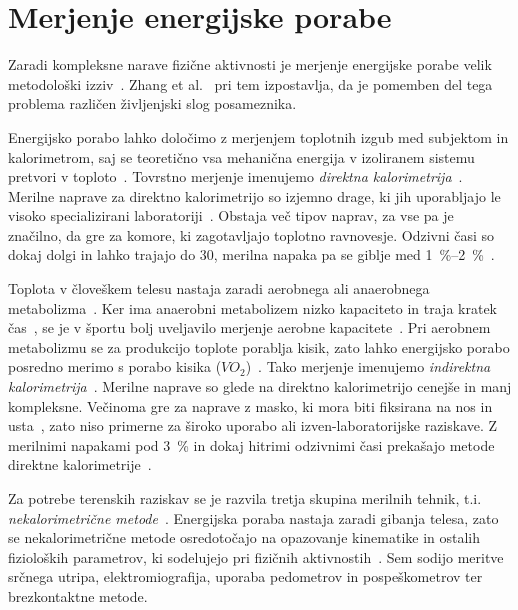 \section{Merjenje energijske porabe}\label{sec:merjenje}
Zaradi kompleksne narave fizične aktivnosti je merjenje energijske porabe velik metodološki izziv~\cite{zhang2004improving}. Zhang et al.~\cite{zhang2004improving} pri tem izpostavlja, da je pomemben del tega problema različen življenjski slog posameznika. 

Energijsko porabo lahko določimo z merjenjem toplotnih izgub med subjektom in kalorimetrom, saj se teoretično vsa mehanična energija v izoliranem sistemu pretvori v toploto~\cite{levine2005measurement}. Tovrstno merjenje imenujemo \emph{direktna kalorimetrija}~\cite{levine2005measurement}. Merilne naprave za direktno kalorimetrijo so izjemno drage, ki jih uporabljajo le visoko specializirani laboratoriji~\cite{levine2005measurement}. Obstaja več tipov naprav, za vse pa je značilno, da gre za komore, ki zagotavljajo toplotno ravnovesje. Odzivni časi so dokaj dolgi in lahko trajajo do \SI{30}{\min}, merilna napaka pa se giblje med \hbox{\SIrange{1}{2}{\%}}~\cite{levine2005measurement}.

Toplota v človeškem telesu nastaja zaradi aerobnega ali anaerobnega metabolizma~\cite{scott2005misconceptions}. Ker ima anaerobni metabolizem nizko kapaciteto in traja kratek čas~\cite{sahlin1998energy}, se je v športu bolj uveljavilo merjenje aerobne kapacitete~\cite{scott2005misconceptions,howley1995criteria}. Pri aerobnem metabolizmu se za produkcijo toplote porablja kisik, zato lahko energijsko porabo posredno merimo s porabo kisika (${VO}_2$)~\cite{scott2005misconceptions}. Tako merjenje imenujemo \emph{indirektna kalorimetrija}~\cite{levine2005measurement}. Merilne naprave so glede na direktno kalorimetrijo cenejše in manj kompleksne. Večinoma gre za naprave z masko, ki mora biti fiksirana na nos in usta~\cite{levine2005measurement}, zato niso primerne za široko uporabo ali izven-laboratorijske raziskave. Z merilnimi napakami pod \SI{3}{\%} in dokaj hitrimi odzivnimi časi prekašajo metode direktne kalorimetrije~\cite{levine2005measurement}.

Za potrebe terenskih raziskav se je razvila tretja skupina merilnih tehnik, t.i. \emph{nekalorimetrične metode}~\cite{levine2005measurement}. Energijska poraba nastaja zaradi gibanja telesa, zato se nekalorimetrične metode osredotočajo na opazovanje kinematike in ostalih fizioloških parametrov, ki sodelujejo pri fizičnih aktivnostih~\cite{levine2005measurement}. Sem sodijo meritve srčnega utripa, elektromiografija, uporaba pedometrov in pospeškometrov ter brezkontaktne metode.

